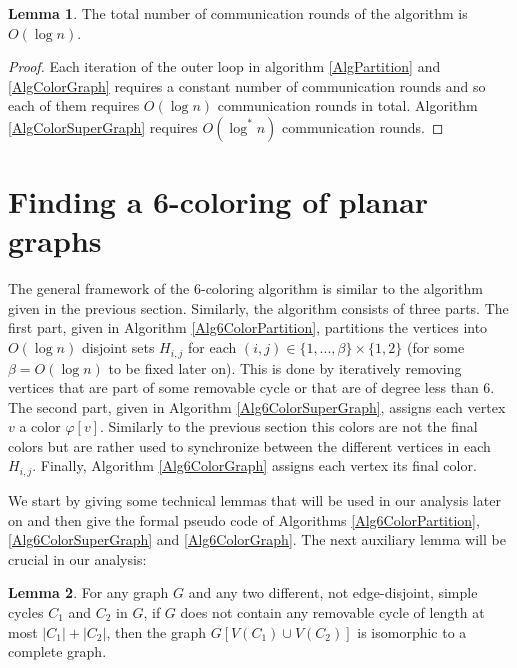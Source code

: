 \documentclass{article}
\theoremstyle{definition}
\newtheorem{lemma}{Lemma}[section]
\begin{document}
\begin{lemma} The total number of communication rounds of the algorithm is $O(\log{n})$. \label{lem:complexity}\end{lemma}
\begin{proof} Each iteration of the outer loop in algorithm \ref{AlgPartition} and \ref{AlgColorGraph} requires a constant number of communication rounds and so each of them requires $O(\log{n})$ communication rounds in total. Algorithm \ref{AlgColorSuperGraph} requires $O(\log^*{n})$ communication rounds. \end{proof}


\section{Finding a 6-coloring of planar graphs}
\label{sec:6-coloring}

The general framework of the 6-coloring algorithm is similar to the algorithm given in the previous section.
Similarly, the algorithm consists of three parts.
The first part, given in Algorithm \ref{Alg6ColorPartition}, partitions the vertices into $O(\log{n})$ disjoint sets $H_{i,j}$ for each $(i,j) \in \{1, ..., \beta\} \times \{1,2\}$ (for some $\beta= O(\log{n})$ to be fixed later on). This is done by iteratively removing vertices that are part of some removable cycle or that are of degree less than $6$.
The second part, given in Algorithm \ref{Alg6ColorSuperGraph}, assigns each vertex $v$ a color $\varphi[v]$. Similarly to the previous section this colors are not the final colors but are rather used to synchronize between the different vertices in each $H_{i,j}$.
Finally, Algorithm \ref{Alg6ColorGraph} assigns each vertex its final color. \smallskip

We start by giving some technical lemmas that will be used in our analysis later on and then give the formal pseudo code of Algorithms \ref{Alg6ColorPartition}, \ref{Alg6ColorSuperGraph} and \ref{Alg6ColorGraph}. The next auxiliary lemma will be crucial in our analysis:

\begin{lemma} For any graph $G$ and any two different, not edge-disjoint, simple cycles $C_{1}$ and $C_{2}$ in $G$, if $G$ does not contain any removable cycle of length at most $|C_{1}| + |C_{2}|$, then the graph $G[V(C_{1}) \cup V(C_{2})]$ is isomorphic to a complete graph. \label{lem:edgeDisCycles}\end{lemma}
\end{document}
